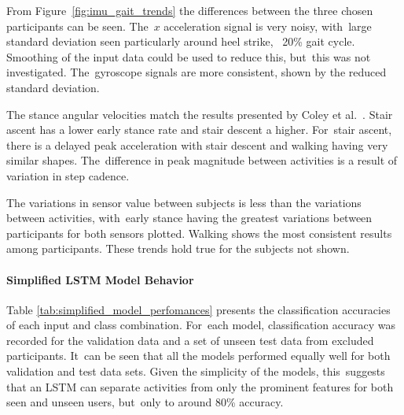 From Figure~\ref{fig:imu_gait_trends} the differences between the three chosen participants can be seen. The~$x$ acceleration signal is very noisy, with~large standard deviation seen particularly around heel strike, ~20\% gait cycle. Smoothing of the input data could be used to reduce this, but~this was not investigated. The~gyroscope signals are more consistent, shown by the reduced standard deviation.

The stance angular velocities match the results presented by Coley et al.~\cite{Coley2005}. Stair ascent has a lower early stance rate and stair descent a higher. For~stair ascent, there is a delayed peak acceleration with stair descent and walking having very similar shapes. The~difference in peak magnitude between activities is a result of variation in step cadence.

The variations in sensor value between subjects is less than the variations between activities, with~early stance having the greatest variations between participants for both sensors plotted. Walking shows the most consistent results among participants. These trends hold true for the subjects not shown.

\paragraph{Simplified LSTM Model Behavior}
Table \ref{tab:simplified_model_perfomances} presents the classification accuracies of each input and class combination. For~each model, classification accuracy was recorded for the validation data and a set of unseen test data from excluded participants. It~can be seen that all the models performed equally well for both validation and test data sets. Given the simplicity of the models, this~suggests that an LSTM can separate activities from only the prominent features for both seen and unseen users, but~only to around 80\% accuracy.

